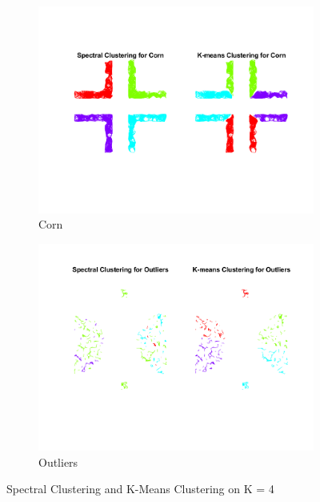 \documentclass[unicode,11pt,a4paper,oneside,numbers=endperiod,openany]{scrartcl}
\begin{document}
\begin{figure}[H]
    \centering
    \begin{subfigure}{0.5\textwidth}
        \centering
        \includegraphics[width=\linewidth]{figures/1.7_Corn.png}
        \caption{Corn}
        \label{fig:corn}
    \end{subfigure}
    \begin{subfigure}{0.5\textwidth}
        \centering
        \includegraphics[width=\linewidth]{figures/1.7_Outliers.png}
        \caption{Outliers}
        \label{fig:outliers}
    \end{subfigure}
    \caption{Spectral Clustering and K-Means Clustering on K = 4}
    \label{fig:overall2}
\end{figure}
\end{document}
